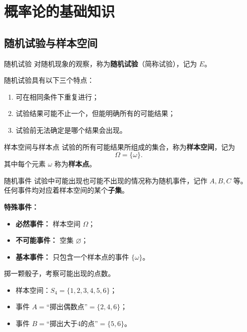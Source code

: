 \chapter{概率论的基础知识}


\section{随机试验与样本空间}

\begin{mydefinition}{随机试验}
	对随机现象的观察，称为\textbf{随机试验}（简称试验），记为 $E$。
\end{mydefinition}

随机试验具有以下三个特点：
\begin{enumerate}
	\item 可在相同条件下重复进行；
	\item 试验结果可能不止一个，但能明确所有的可能结果；
	\item 试验前无法确定是哪个结果会出现。
\end{enumerate}

\begin{mydefinition}{样本空间与样本点}
	试验的所有可能结果所组成的集合，称为\textbf{样本空间}，记为
	\[\Omega = \{\omega\}.\]
	其中每个元素 $\omega$ 称为\textbf{样本点}。
\end{mydefinition}

\begin{mydefinition}{随机事件}
	试验中可能出现也可能不出现的情况称为随机事件，记作 $A,B,C$ 等。任何事件均对应着样本空间的某个\textbf{子集}。
\end{mydefinition}

\textbf{特殊事件：}
\begin{itemize}
	\item \textbf{必然事件：} 样本空间 $\Omega$；
	\item \textbf{不可能事件：} 空集 $\varnothing$；
	\item \textbf{基本事件：} 只包含一个样本点的事件 $\{\omega\}$。
\end{itemize}

\begin{example}[掷骰子]
掷一颗骰子，考察可能出现的点数。
\begin{itemize}
	\item 样本空间：$S_4 = \{1,2,3,4,5,6\}$；
	\item 事件 $A = \text{``掷出偶数点''} = \{2,4,6\}$；
	\item 事件 $B = \text{``掷出大于4的点''} = \{5,6\}$。
\end{itemize}
\end{example}

